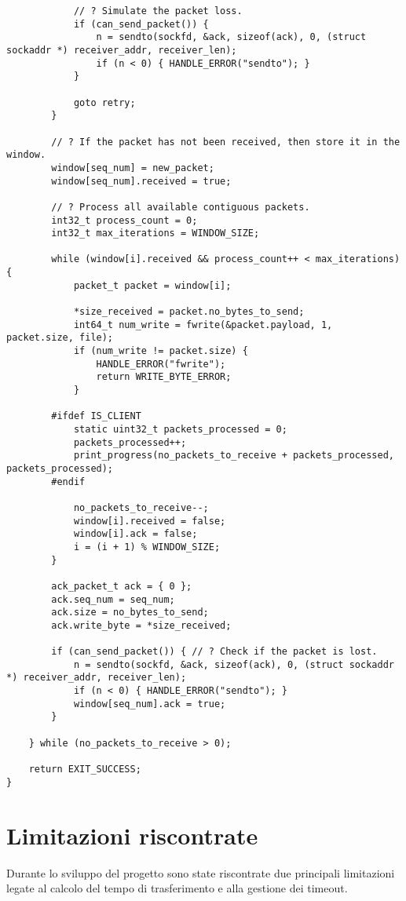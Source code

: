 \begin{lstlisting}
            // ? Simulate the packet loss.
            if (can_send_packet()) {
                n = sendto(sockfd, &ack, sizeof(ack), 0, (struct sockaddr *) receiver_addr, receiver_len);
                if (n < 0) { HANDLE_ERROR("sendto"); }
            }

            goto retry;
        }

        // ? If the packet has not been received, then store it in the window.
        window[seq_num] = new_packet;
        window[seq_num].received = true;

        // ? Process all available contiguous packets.
        int32_t process_count = 0;
        int32_t max_iterations = WINDOW_SIZE;

        while (window[i].received && process_count++ < max_iterations) {
            packet_t packet = window[i];
            
            *size_received = packet.no_bytes_to_send;
            int64_t num_write = fwrite(&packet.payload, 1, packet.size, file);
            if (num_write != packet.size) {
                HANDLE_ERROR("fwrite");
                return WRITE_BYTE_ERROR;
            }

        #ifdef IS_CLIENT
            static uint32_t packets_processed = 0;
            packets_processed++;
            print_progress(no_packets_to_receive + packets_processed, packets_processed);
        #endif
        
            no_packets_to_receive--;
            window[i].received = false;
            window[i].ack = false;
            i = (i + 1) % WINDOW_SIZE;
        }

        ack_packet_t ack = { 0 };
        ack.seq_num = seq_num;
        ack.size = no_bytes_to_send;
        ack.write_byte = *size_received;
        
        if (can_send_packet()) { // ? Check if the packet is lost.
            n = sendto(sockfd, &ack, sizeof(ack), 0, (struct sockaddr *) receiver_addr, receiver_len);
            if (n < 0) { HANDLE_ERROR("sendto"); }
            window[seq_num].ack = true;
        }
    
    } while (no_packets_to_receive > 0);

    return EXIT_SUCCESS;
}
\end{lstlisting}

\section{Limitazioni riscontrate }
Durante lo sviluppo del progetto sono state riscontrate due principali limitazioni legate al calcolo del tempo di trasferimento e alla gestione dei timeout.

